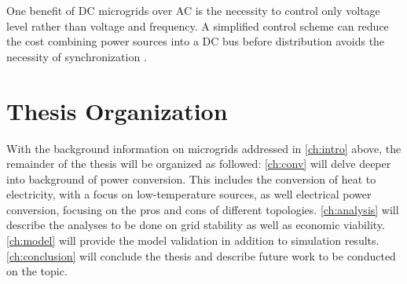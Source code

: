 One benefit of DC microgrids over AC is the necessity to control only voltage level rather than voltage and frequency. A simplified control scheme can reduce the cost combining power sources into a DC bus before distribution avoids the necessity of synchronization \cite{Lotfi2015}.

\section{Thesis Organization}
With the background information on microgrids addressed in \autoref{ch:intro} above, the remainder of the thesis will be organized as followed: \autoref{ch:conv} will delve deeper into background of power conversion. This includes the conversion of heat to electricity, with a focus on low-temperature sources, as well electrical power conversion, focusing on the pros and cons of different topologies. 
\autoref{ch:analysis} will describe the analyses to be done on grid stability as well as economic viability. \autoref{ch:model} will provide the model validation in addition to simulation results. \autoref{ch:conclusion} will conclude the thesis and describe future work to be conducted on the topic.

